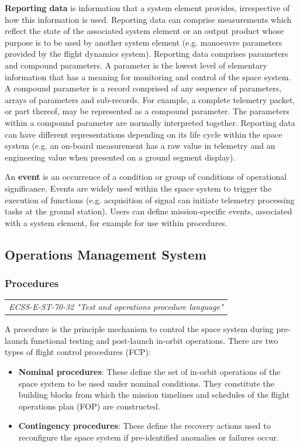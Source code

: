 \textbf{Reporting data} is information that a system element provides, irrespective of how this information is used. Reporting data can comprise measurements which reflect the state of the associated system element or an output product whose purpose is to be used by another system element (e.g. manoeuvre parameters provided by the flight dynamics system). Reporting data comprises parameters and compound parameters. A parameter is the lowest level of elementary information that has a meaning for monitoring and control of the space system. A compound parameter is a record comprised of any sequence of parameters, arrays of parameters and sub-records. For example, a complete telemetry packet, or part thereof, may be represented as a compound parameter. The parameters within a compound parameter are normally interpreted together. Reporting data can have different representations depending on its life cycle within the space system (e.g. an on-board measurement has a raw value in telemetry and an engineering value when presented on a ground segment display).

An \textbf{event} is an occurrence of a condition or group of conditions of operational significance. Events are widely used within the space system to trigger the execution of functions (e.g. acquisition of signal can initiate telemetry processing tasks at the ground station). Users can define mission-specific events, associated with a system element, for example for use within procedures.

\subsection{Operations Management System}

\subsubsection{Procedures}

\begin{tabular}{l}
\textit{ECSS-E-ST-70-32 "Test and operations procedure language" \cite{ECSS-E-ST-70-32}} \\
\end{tabular}

A procedure is the principle mechanism to control the space system during pre-launch functional testing and post-launch in-orbit operations. There are two types of flight control procedures (FCP):

\begin{itemize}
\item \textbf{Nominal procedures}: These define the set of in-orbit operations of the space system to be used under nominal conditions. They constitute the building blocks from which the mission timelines and schedules of the flight operations plan (FOP) are constructed. 
\item \textbf{Contingency procedures}: These define the recovery actions used to reconfigure the space system if pre-identified anomalies or failures occur.
\end{itemize}

